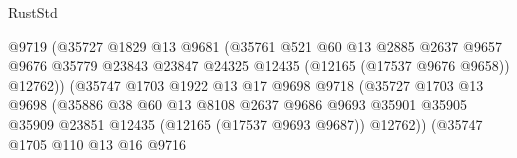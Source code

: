 \begin{lexlean}{RustStd}
\begin{coremodule}
                                        @9719
                                        (@35727
                                          @1829
                                          @13
                                          @9681
                                          (@35761
                                            @521
                                            @60
                                            @13
                                            @2885
                                            @2637
                                            @9657
                                            @9676
                                            @35779
                                            @23843
                                            @23847
                                            @24325
                                            @12435
                                            (@12165 (@17537 @9676 @9658))
                                            @12762))
                                        (@35747
                                          @1703
                                          @1922
                                          @13
                                          @17
                                          @9698
                                          @9718
                                          (@35727
                                            @1703
                                            @13
                                            @9698
                                            (@35886
                                              @38
                                              @60
                                              @13
                                              @8108
                                              @2637
                                              @9686
                                              @9693
                                              @35901
                                              @35905
                                              @35909
                                              @23851
                                              @12435
                                              (@12165 (@17537 @9693 @9687))
                                              @12762))
                                          (@35747
                                            @1705
                                            @110
                                            @13
                                            @16
                                            @9716

\end{coremodule}
\end{lexlean}
